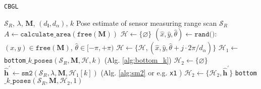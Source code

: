 \begin{algorithm}[]
  \caption{\texttt{CBGL}}
  \begin{spacing}{1.0}
  \begin{algorithmic}[1]
    \REQUIRE $\mathcal{S}_R$, $\lambda$, $\bm{M}$, $(d_{\bm{l}}, d_\alpha)$, $k$
    \ENSURE Pose estimate of sensor measuring range scan $\mathcal{S}_R$ %
    \STATE $A \leftarrow \texttt{calculate\_area}(\texttt{free}(\bm{M}))$
    \STATE $\mathcal{H} \leftarrow \{\varnothing\}$
      \STATE \small $(\hat{x},\hat{y},\hat{\theta}) \leftarrow \texttt{rand()}$: $(x,y) \in \texttt{free}(\bm{M})$, $\hat{\theta} \in [-\pi,+\pi)$
        \STATE $\mathcal{H} \leftarrow \{\mathcal{H}, (\hat{x}, \hat{y}, \hat{\theta} + j \cdot 2\pi / d_{\alpha})\}$     \label{alg:cbgl:h}
      \ENDFOR
    \ENDFOR
    \STATE $\mathcal{H}_1 \leftarrow$ \texttt{bottom}$\_k\_\texttt{poses}(\mathcal{S}_R, \bm{M}, \mathcal{H}, k)$ \hfill {\small (Alg. \ref{alg:bottom_k}}) \label{alg:cbgl:h1}
    \STATE $\mathcal{H}_2 \leftarrow \{\varnothing \}$
      \STATE $\hat{\bm{h}}^\prime \leftarrow \texttt{sm2}(\mathcal{S}_R, \lambda, \bm{M}, \mathcal{H}_1[k])$ \hfill {\small (Alg. \ref{alg:sm2} or e.g. \texttt{x1} \cite{Filotheou2023a}})
      \STATE $\mathcal{H}_2 \leftarrow \{\mathcal{H}_2, \hat{\bm{h}}^\prime\}$  \label{alg:cbgl:h2}
    \ENDFOR
    \RETURN \texttt{bottom}$\_k\_\texttt{poses}(\mathcal{S}_R, \bm{M}, \mathcal{H}_2, 1)$
  \end{algorithmic}
  \end{spacing}
  \label{alg:cbgl}
\end{algorithm}

